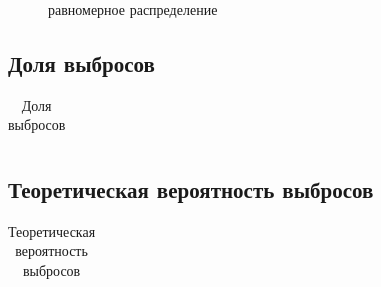\documentclass[a4paper]{article}
\begin{document}
\begin{figure}[H]
\label{fig:uniform}
\caption{равномерное распределение}
\end{figure}

\subsection{Доля выбросов}
\begin{table}[H]
            \centering
            \begin{tabular}{|c|c|c|}
                \hline
                
            \end{tabular}
            \caption{Доля выбросов}
            \label{tab:experimental_anomaly}
            \end{table}


\subsection{Теоретическая вероятность выбросов}
\begin{table}[H]
            \centering
            \begin{tabular}{|c|c|c|c|c|c|}
                \hline
                
            \end{tabular}
            \caption{Теоретическая вероятность выбросов}
            \label{tab:theoretical_anomaly}
            \end{table}
\end{document}
